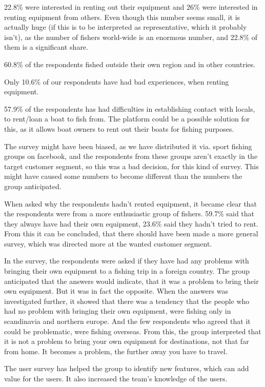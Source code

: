 22.8\% were interested in renting out their equipment and 26\% were interested in renting equipment from others. Even though this number seems small, it is actually huge (if this is to be interpreted as representative, which it probably isn’t), as the number of fishers world-wide is an enormous number, and 22.8\% of them is a significant share.


60.8\% of the respondents fished outside their own region and in other countries.


Only 10.6\% of our respondents have had bad experiences, when renting equipment.


57.9\% of the respondents has had difficulties in establishing contact with locals, to rent/loan a boat to fish from. The platform could be a possible solution for this, as it allows boat owners to rent out their boats for fishing purposes.


The survey might have been biased, as we have distributed it via. sport fishing groups on facebook, and the respondents from these groups aren’t exactly in the target customer segment, so this was a bad decision, for this kind of survey.
This might have caused some numbers to become different than the numbers the group anticipated.


When asked why the respondents hadn’t rented equipment, it became clear that the respondents were from a more enthusiastic group of fishers. 59.7\% said that they always have had their own equipment, 23.6\% said they hadn’t tried to rent. From this it can be concluded, that there should have been made a more general survey, which was directed more at the wanted customer segment.


In the survey, the respondents were asked if they have had any problems with bringing their own equipment to a fishing trip in a foreign country. The group anticipated that the answers would indicate, that it was a problem to bring their own equipment. But it was in fact the opposite.
When the answers was investigated further, it showed that there was a tendency that the people who had no problem with bringing their own equipment, were fishing only in scandinavia and northern europe. And the few respondents who agreed that it could be problematic, were fishing overseas.
From this, the group interpreted that it is not a problem to bring your own equipment for destinations, not that far from home. It becomes a problem, the further away you have to travel.


The user survey has helped the group to identify new features, which can add value for the users. It also increased the team's knowledge of the users.



